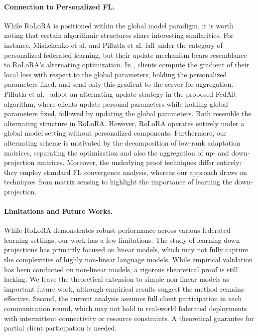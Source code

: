 \documentclass{article}
\theoremstyle{plain}
\theoremstyle{definition}
\theoremstyle{remark}
\begin{document}
{\paragraph{Connection to Personalized FL.} While RoLoRA is positioned within the global model paradigm, it is worth noting that certain algorithmic structures share interesting similarities. For instance, Mishchenko et al. \cite{mishchenko2025partially} and Pillutla et al. \cite{pmlr-v162-pillutla22a} fall under the category of personalized federated learning, but their update mechanism bears resemblance to RoLoRA's alternating optimization. In \cite{mishchenko2025partially}, clients compute the gradient of their local loss with respect to the global parameters, holding the personalized parameters fixed, and send only this gradient to the server for aggregation. 
Pillutla et al.~\cite{pmlr-v162-pillutla22a} adopt an alternating update strategy in the proposed FedAlt algorithm, where clients update personal parameters while holding global parameters fixed, followed by updating the global parameters. Both resemble the alternating structure in RoLoRA. However, RoLoRA operates entirely under a global model setting without personalized components. Furthermore, our alternating scheme is motivated by the decomposition of low-rank adaptation matrices, separating the optimization and also the aggregation of up- and down-projection matrices. Moreover, the underlying proof techniques differ entirely: they employ standard FL convergence analysis, whereas our approach draws on techniques from matrix sensing to highlight the importance of learning the down-projection.

\paragraph{Limitations and Future Works.} While RoLoRA demonstrates robust performance across various federated learning settings, our work has a few limitations. The study of learning down-projections has primarily focused on linear models, which may not fully capture the complexities of highly non-linear language models. While empirical validation has been conducted on non-linear models, a rigorous theoretical proof is still lacking. We leave the theoretical extension to simple non-linear models as important future work, although empirical results suggest the method remains effective. Second, the current analysis assumes full client participation in each communication round, which may not hold in real-world federated deployments with intermittent connectivity or resource constraints. A theoretical guarantee for partial client participation is needed. 
}
\end{document}
